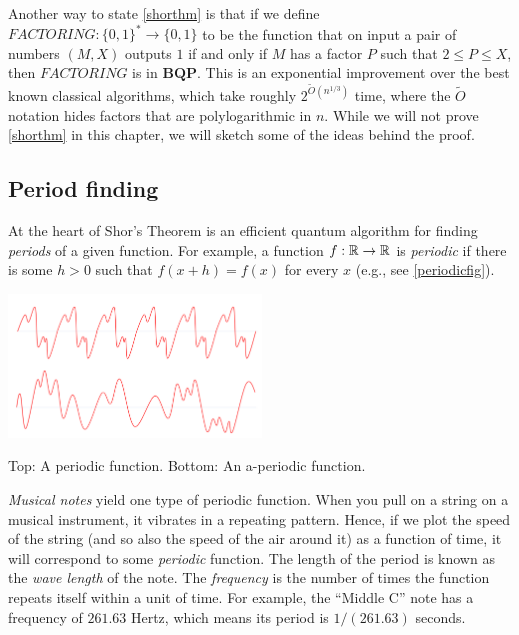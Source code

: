 \hypertarget{shorthm}{}

Another way to state \cref{shorthm} is that if we define
\(\ensuremath{\mathit{FACTORING}}:\{0,1\}^* \rightarrow \{0,1\}\) to be
the function that on input a pair of numbers \((M,X)\) outputs \(1\) if
and only if \(M\) has a factor \(P\) such that \(2 \leq P \leq X\), then
\(\ensuremath{\mathit{FACTORING}}\) is in \(\mathbf{BQP}\). This is an
exponential improvement over the best known classical algorithms, which
take roughly \(2^{\tilde{O}(n^{1/3})}\) time, where the \(\tilde{O}\)
notation hides factors that are polylogarithmic in \(n\). While we will
not prove \cref{shorthm} in this chapter, we will sketch some of the
ideas behind the proof.

\subsection{Period finding}\label{Period-finding}

At the heart of Shor's Theorem is an efficient quantum algorithm for
finding \emph{periods} of a given function. For example, a function
\(f:{\mathbb{R}} \rightarrow {\mathbb{R}}\) is \emph{periodic} if there is some \(h>0\) such
that \(f(x+h)=f(x)\) for every \(x\) (e.g., see \cref{periodicfig}).


\begin{marginfigure}
\centering
\includegraphics[width=\linewidth, height=1.5in, keepaspectratio]{../figure/periodic_vs_aperiodic.png}
\caption{Top: A periodic function. Bottom: An a-periodic function.}
\label{periodicfig}
\end{marginfigure}

\emph{Musical notes} yield one type of periodic function. When you pull
on a string on a musical instrument, it vibrates in a repeating pattern.
Hence, if we plot the speed of the string (and so also the speed of the
air around it) as a function of time, it will correspond to some
\emph{periodic} function. The length of the period is known as the
\emph{wave length} of the note. The \emph{frequency} is the number of
times the function repeats itself within a unit of time. For example,
the ``Middle C'' note has a frequency of \(261.63\) Hertz, which means
its period is \(1/(261.63)\) seconds.

